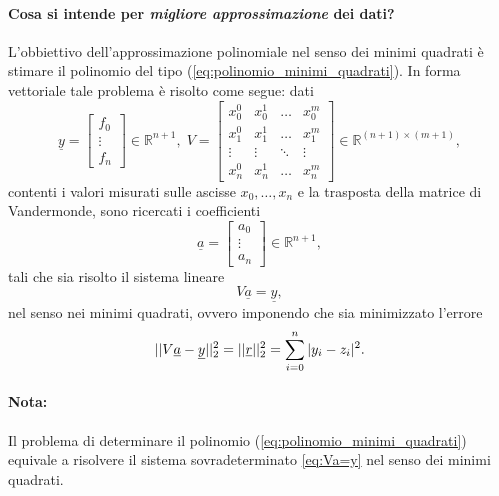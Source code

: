 \paragraph{Cosa si intende per \textit{migliore approssimazione} dei dati?} L'obbiettivo dell'approssimazione polinomiale nel senso dei minimi quadrati è stimare il polinomio del tipo (\ref{eq:polinomio_minimi_quadrati}). In forma vettoriale tale problema è risolto come segue: dati
\begin{equation}
	\underline{y}=
	\begin{bmatrix}
		f_0\\
		\vdots\\
		f_n
	\end{bmatrix}\in\mathbb{R}^{n+1},\; 
	V=\begin{bmatrix}
		x_0^0 & x_0^1 & \hdots & x_0^m\\
		x_1^0 & x_1^1 & \hdots & x_1^m\\
		\vdots & \vdots &\ddots & \vdots\\
		x_n^0 & x_n^1 & \hdots & x_n^m
	\end{bmatrix}\in\mathbb R^{(n+1)\times (m+1)},
\end{equation}
contenti i valori misurati sulle ascisse $x_0, \hdots, x_n$ e la trasposta della matrice di Vandermonde, sono ricercati i coefficienti
\begin{equation*}
	\underline{a}=
	\begin{bmatrix}
		a_0\\
		\vdots\\
		a_n
	\end{bmatrix}\in\mathbb{R}^{n+1},
\end{equation*}
tali che sia risolto il sistema lineare
\begin{equation}\label{eq:Va=y}
	V\underline{a}=\underline{y},
\end{equation}
nel senso nei minimi quadrati, ovvero imponendo che sia minimizzato l'errore
\begin{equation*}
	||V\uline a - \uline y||_2^2 = ||\underline r||_2^2=\sum_{i=0}^n|y_i-z_i|^2.
\end{equation*}

\paragraph{Nota:} Il problema di determinare il polinomio (\ref{eq:polinomio_minimi_quadrati})  equivale a risolvere il sistema sovradeterminato \ref{eq:Va=y} nel senso dei minimi quadrati.


